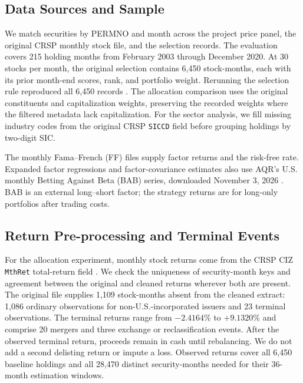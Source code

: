 \documentclass[letterpaper,journal]{IEEEtran}
\begin{document}
\subsection{Data Sources and Sample}
We match securities by PERMNO and month across the project price panel, the original CRSP monthly stock file, and the selection records. The evaluation covers 215 holding months from February 2003 through December 2020. At 30 stocks per month, the original selection contains 6,450 stock-months, each with its prior month-end scores, rank, and portfolio weight. Rerunning the selection rule reproduced all 6,450 records \cite{selectioncode}. The allocation comparison uses the original constituents and capitalization weights, preserving the recorded weights where the filtered metadata lack capitalization. For the sector analysis, we fill missing industry codes from the original CRSP \texttt{SICCD} field before grouping holdings by two-digit SIC.

The monthly Fama--French (FF) files supply factor returns and the risk-free rate. Expanded factor regressions and factor-covariance estimates also use AQR's U.S. monthly Betting Against Beta (BAB) series, downloaded November 3, 2026 \cite{bab,aqrbabdata}. BAB is an external long--short factor; the strategy returns are for long-only portfolios after trading costs.

\subsection{Return Pre-processing and Terminal Events}
For the allocation experiment, monthly stock returns come from the CRSP CIZ \texttt{MthRet} total-return field \cite{crsp}. We check the uniqueness of security-month keys and agreement between the original and cleaned returns wherever both are present. The original file supplies 1,109 stock-months absent from the cleaned extract: 1,086 ordinary observations for non-U.S.-incorporated issuers and 23 terminal observations. The terminal returns range from $-2.4164\%$ to $+9.1320\%$ and comprise 20 mergers and three exchange or reclassification events. After the observed terminal return, proceeds remain in cash until rebalancing. We do not add a second delisting return or impute a loss. Observed returns cover all 6,450 baseline holdings and all 28,470 distinct security-months needed for their 36-month estimation windows.
\end{document}

